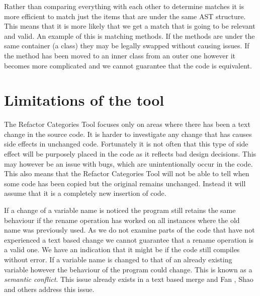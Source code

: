 
% 
% 

Rather than comparing everything with each other to determine matches it is more efficient to match just the items that are under the same AST structure.  This means that it is more likely that we get a match that is going to be relevant and valid.  An example of this is matching methods. If the methods are under the same container (a class) they may be legally swapped without causing issues.  If the method has been moved to an inner class from an outer one however it becomes more complicated and we cannot guarantee that the code is equivalent.  


\section{Limitations of the tool}
The Refactor Categories Tool focuses only on areas where there has been a text change in the source code. 
It is harder to investigate any change that has causes side effects in unchanged code.  Fortunately it is not often that this type of side effect will be purposely placed in the code as it reflects bad design decisions.  This may however be an issue with bugs, which are unintentionally occur in the code.
This also means that the Refactor Categories Tool will not be able to tell when some code has been copied but the original remains unchanged. Instead it will assume that it is a completely new insertion of code.

If a change of a variable name is noticed the program still retains the same behaviour if the rename operation has worked on all instances where the old name was previously used.  As we do not examine parts of the code that have not experienced a text based change we cannot guarantee that a rename operation is a valid one. We have an indication that it might be if the code still compiles without error. If a variable name is changed to that of an already existing variable however the behaviour of the program could change. This is known as a \emph{semantic conflict}.  This issue already exists in a text based merge and Fan \cite{Fan2012}, Shao \cite{Shao2009} and others address this issue. 
